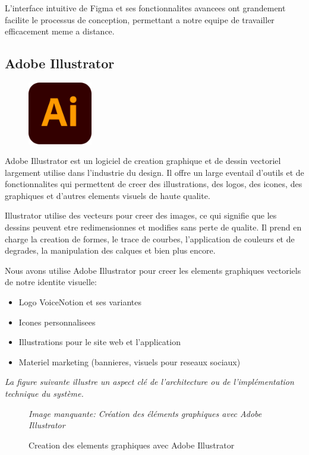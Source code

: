 L'interface intuitive de Figma et ses fonctionnalites avancees ont grandement facilite le processus de conception, permettant a notre equipe de travailler efficacement meme a distance.


\subsection{Adobe Illustrator}
\begin{figure}
    \centering
    \includegraphics[width=0.25\textwidth]{assets/docs/illustrator.png}
\end{figure}
Adobe Illustrator est un logiciel de creation graphique et de dessin vectoriel largement utilise dans l'industrie du design. Il offre un large eventail d'outils et de fonctionnalites qui permettent de creer des illustrations, des logos, des icones, des graphiques et d'autres elements visuels de haute qualite. 

Illustrator utilise des vecteurs pour creer des images, ce qui signifie que les dessins peuvent etre redimensionnes et modifies sans perte de qualite. Il prend en charge la creation de formes, le trace de courbes, l'application de couleurs et de degrades, la manipulation des calques et bien plus encore.

Nous avons utilise Adobe Illustrator pour creer les elements graphiques vectoriels de notre identite visuelle:

\begin{itemize}
    \item Logo VoiceNotion et ses variantes
    \item Icones personnalisees
    \item Illustrations pour le site web et l'application
    \item Materiel marketing (bannieres, visuels pour reseaux sociaux)
\end{itemize}

\noindent
\textit{La figure suivante illustre un aspect clé de l'architecture ou de l'implémentation technique du système.}
\begin{figure}[H]
\centering
\textit{Image manquante: Création des éléments graphiques avec Adobe Illustrator}
\caption{Creation des elements graphiques avec Adobe Illustrator}
\label{fig:illustrator-assets}
\end{figure}

